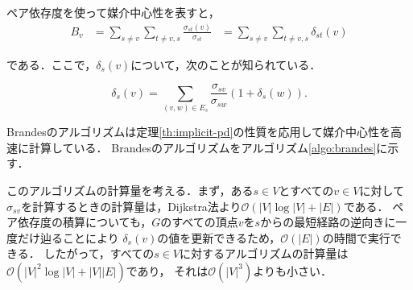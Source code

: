 ペア依存度を使って媒介中心性を表すと，
\begin{equation*}
  \begin{aligned}
    B_v&=\sum_{s\neq v}\sum_{t\neq v,s}\frac{\sigma_{st}(v)}{\sigma_{st}}
    &=\sum_{s\neq v}\sum_{t\neq v,s}\delta_{st}(v)
  \end{aligned}
\end{equation*}

である．ここで，$\delta_{s}(v)$について，次のことが知られている．

\begin{theorem-without-proof}
  \label{th:implicit-pd}
  \begin{equation}
    \label{eq:implicit-pd}
    \delta_{s}(v)=\sum_{(v,w)\in E_s}\frac{\sigma_{sv}}{\sigma_{sw}}(1+\delta_{s}(w)).
  \end{equation}
\end{theorem-without-proof}

Brandesのアルゴリズムは定理\ref{th:implicit-pd}の性質を応用して媒介中心性を高速に計算している．
Brandesのアルゴリズムをアルゴリズム\ref{algo:brandes}に示す．

このアルゴリズムの計算量を考える．まず，ある$s\in V$とすべての$v\in V$に対して
$\sigma_{sv}$を計算するときの計算量は，Dijkstra法より$\mathcal{O}(|V|\log |V|+|E|)$である．
ペア依存度の積算についても，$G$のすべての頂点$v$を$s$からの最短経路の逆向きに一度だけ辿ることにより
$\delta_s(v)$の値を更新できるため，$\mathcal{O}(|E|)$の時間で実行できる\cite{Brandes2001}．
したがって，すべての$s\in V$に対するアルゴリズムの計算量は$\mathcal{O}(|V|^2\log |V|+|V||E|)$であり，
それは$\mathcal{O}(|V|^3)$よりも小さい．

